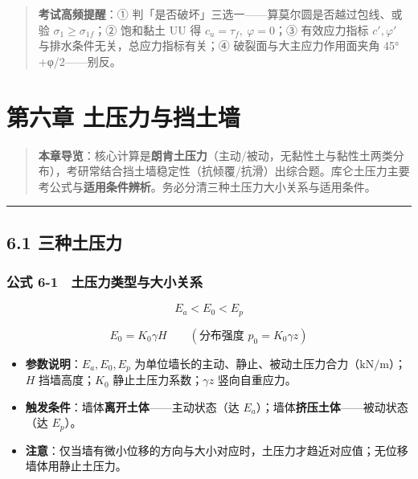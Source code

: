 \documentclass[
]{article}
\providecommand{\tightlist}{%
  \setlength{\itemsep}{0pt}\setlength{\parskip}{0pt}}
\begin{document}
\begin{quote}
\textbf{考试高频提醒}：①
判「是否破坏」三选一------算莫尔圆是否越过包线、或验
\(\sigma_1\ge\sigma_{1f}\)；② 饱和黏土 UU 得
\(c_u=\tau_f,\ \varphi=0\)；③ 有效应力指标 \(c',\varphi'\)
与排水条件无关，总应力指标有关；④ 破裂面与大主应力作用面夹角
45°+φ/2------别反。
\end{quote}

\newpage

\section{第六章
土压力与挡土墙}\label{ux7b2cux516dux7ae0-ux571fux538bux529bux4e0eux6321ux571fux5899}

\begin{quote}
\textbf{本章导览}：核心计算是\textbf{朗肯土压力}（主动/被动，无黏性土与黏性土两类分布），考研常结合挡土墙稳定性（抗倾覆/抗滑）出综合题。库仑土压力主要考公式与\textbf{适用条件辨析}。务必分清三种土压力大小关系与适用条件。
\end{quote}

\begin{center}\rule{0.5\linewidth}{0.5pt}\end{center}

\subsection{6.1 三种土压力}\label{ux4e09ux79cdux571fux538bux529b}

\subsubsection{公式
6-1　土压力类型与大小关系}\label{ux516cux5f0f-6-1-ux571fux538bux529bux7c7bux578bux4e0eux5927ux5c0fux5173ux7cfb}

\[E_a<E_0<E_p\]

\[E_0=K_0\gamma H\qquad(\text{分布强度 }p_0=K_0\gamma z)\]

\begin{itemize}
\tightlist
\item
  \textbf{参数说明}：\(E_a,E_0,E_p\)
  为单位墙长的主动、静止、被动土压力合力（\(\mathrm{kN/m}\)）；\(H\)
  挡墙高度；\(K_0\) 静止土压力系数；\(\gamma z\) 竖向自重应力。
\item
  \textbf{触发条件}：墙体\textbf{离开土体}------主动状态（达
  \(E_a\)）；墙体\textbf{挤压土体}------被动状态（达 \(E_p\)）。
\item
  \textbf{注意}：仅当墙有微小位移的方向与大小对应时，土压力才趋近对应值；无位移墙体用静止土压力。
\end{itemize}
\end{document}
